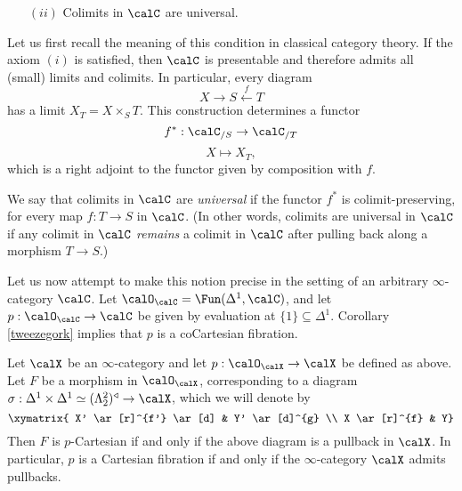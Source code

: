 \begin{itemize}
\item[$(ii)$] Colimits in $\calC$ are universal.
\end{itemize}

Let us first recall the meaning of this condition in classical category theory. If the axiom $(i)$ is satisfied, then $\calC$ is presentable and therefore admits all (small) limits and colimits. In particular, every diagram
$$ X \rightarrow S \stackrel{f}{\leftarrow} T$$
has a limit $X_{T} = X \times_{S} T$.
This construction determines
a functor
$$ f^{\ast}: \calC_{/S} \rightarrow \calC_{/T}$$
$$X \mapsto X_{T},$$
which is a right adjoint to the functor given by composition with $f$.

We say that colimits in $\calC$ are {\it universal} if the functor $f^{\ast}$ is colimit-preserving, for
every map $f: T \rightarrow S$ in $\calC$. (In other words, colimits are universal in $\calC$ if any colimit in $\calC$ {\em remains} a colimit in $\calC$ after pulling back along a morphism $T \rightarrow S$.)

Let us now attempt to make this notion precise in the setting of an arbitrary $\infty$-category
$\calC$. Let $\calO_{\calC} = \Fun(\Delta^1, \calC)$, and let $p: \calO_{\calC} \rightarrow \calC$ be given by evaluation at
$\{1\} \subseteq \Delta^1$. Corollary \ref{tweezegork} implies that $p$ is a coCartesian fibration.

\begin{lemma}\label{charpull}
Let $\calX$ be an $\infty$-category and let $p: \calO_{\calX} \rightarrow \calX$ be defined as above. Let
$F$ be a morphism in $\calO_{\calX}$, corresponding to a diagram $\sigma: \Delta^1 \times \Delta^1 \simeq (\Lambda^2_2)^{\triangleleft} \rightarrow \calX$, which we will denote by
$$ \xymatrix{ X' \ar[r]^{f'} \ar[d] & Y' \ar[d]^{g} \\
X \ar[r]^{f} & Y}$$
Then $F$ is $p$-Cartesian if and only if the above diagram is a pullback in $\calX$.
In particular, $p$ is a Cartesian fibration if and only if the $\infty$-category $\calX$ admits pullbacks.
\end{lemma}

